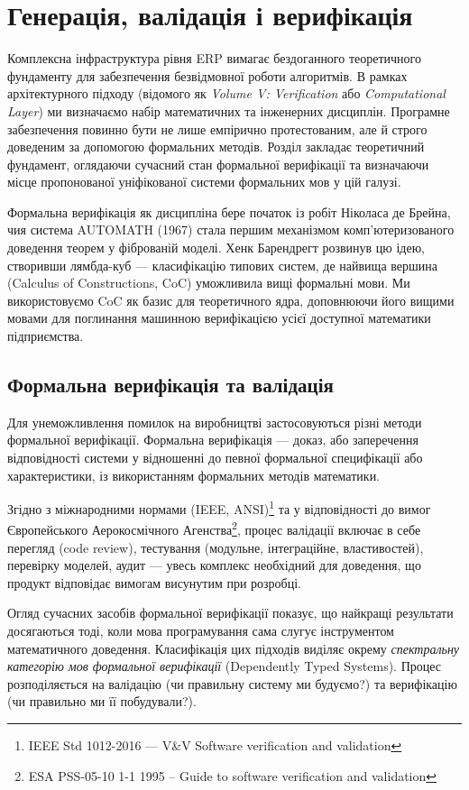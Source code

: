 \chapter{Генерація, валідація і верифікація}

Комплексна інфраструктура рівня ERP вимагає бездоганного теоретичного фундаменту для забезпечення безвідмовної роботи алгоритмів. В рамках архітектурного підходу (відомого як \emph{Volume V: Verification} або \emph{Computational Layer}) ми визначаємо набір математичних та інженерних дисциплін. Програмне забезпечення повинно бути не лише емпірично протестованим, але й строго доведеним за допомогою формальних методів. Розділ закладає теоретичний фундамент, оглядаючи сучасний стан формальної верифікації та визначаючи місце пропонованої уніфікованої системи формальних мов у цій галузі.

Формальна верифікація як дисципліна бере початок із робіт Ніколаса де Брейна, чия система AUTOMATH (1967) стала першим механізмом комп’ютеризованого доведення теорем у фіброваній моделі. Хенк Барендрегт розвинув цю ідею, створивши лямбда-куб — класифікацію типових систем, де найвища вершина (Calculus of Constructions, CoC) уможливила вищі формальні мови. Ми використовуємо CoC як базис для теоретичного ядра, доповнюючи його вищими мовами для поглинання машинною верифікацією усієї доступної математики підприємства.

\section{Формальна верифікація та валідація}

Для унеможливлення помилок на виробництві застосовуються різні методи формальної верифікації. Формальна верифікація — доказ, або заперечення відповідності системи у відношенні до певної формальної специфікації або характеристики, із використанням формальних методів математики.

Згідно з міжнародними нормами (IEEE, ANSI)\footnote{IEEE Std 1012-2016 --- V\&V Software verification and validation} та у відповідності до вимог Європейського Аерокосмічного Агенства\footnote{ESA PSS-05-10 1-1 1995 -- Guide to software verification and validation}, процес валідації включає в себе перегляд (code review), тестування (модульне, інтеграційне, властивостей), перевірку моделей, аудит — увесь комплекс необхідний для доведення, що продукт відповідає вимогам висунутим при розробці.

Огляд сучасних засобів формальної верифікації показує, що найкращі результати досягаються тоді, коли мова програмування сама слугує інструментом математичного доведення. Класифікація цих підходів виділяє окрему \emph{спектральну категорію мов формальної верифікації} (Dependently Typed Systems). Процес розподіляється на валідацію (чи правильну систему ми будуємо?) та верифікацію (чи правильно ми її побудували?).

